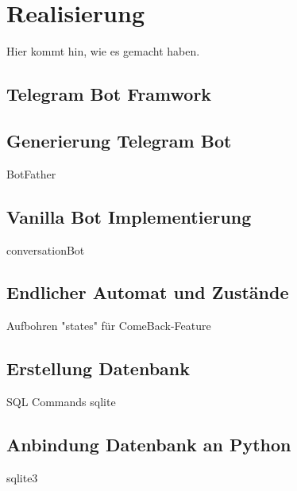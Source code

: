 \chapter{Realisierung}

Hier kommt hin, wie es gemacht haben.  



\section{Telegram Bot Framwork}

\section{Generierung Telegram Bot}

BotFather

\section{Vanilla Bot Implementierung}

conversationBot

\section{Endlicher Automat und Zustände}
Aufbohren "states" für ComeBack-Feature

\section{Erstellung Datenbank}
SQL Commands
sqlite

\section{Anbindung Datenbank an Python}
sqlite3

\section{}